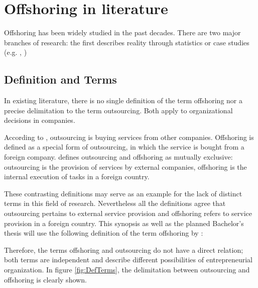 \section{Offshoring in literature}
Offshoring has been widely studied in the past decades. There are two major branches of research: the first describes reality through statistics or case studies (e.g. \cite{Rottman.2008}, \cite{Pedersen.2013} )

\subsection{Definition and Terms}
In existing literature, there is no single definition of the term offshoring nor a precise delimitation to the term outsourcing. Both apply to organizational decisions in companies. 

According to \cite[pp. 1f]{Specht.2007}, outsourcing is buying services from other companies. Offshoring is defined as a special form of outsourcing, in which the service is bought from a foreign company. \cite[p. 2]{Alebrand.2013} defines outsourcing and offshoring as mutually exclusive: outsourcing is the provision of services by external companies, offshoring is the internal execution of tasks in a foreign country.

These contrasting definitions may serve as an example for the lack of distinct terms in this field of research. Nevertheless all the definitions agree that outsourcing pertains to external service provision and offshoring refers to service provision in a foreign country. This synopsis as well as the planned Bachelor's thesis will use the following definition of the term offshoring by \cite[p. 321]{Andersson.2016}:


Therefore, the terms offshoring and outsourcing do not have a direct relation; both terms are independent and describe different possibilities of entrepreneurial organization. In figure \ref{fig:DefTerms}, the delimitation between outsourcing and offshoring is clearly shown.

